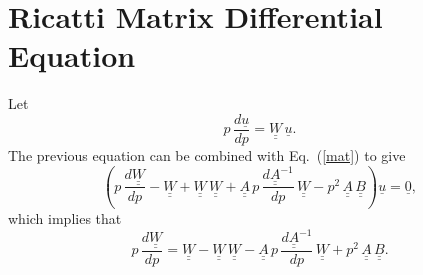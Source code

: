 \documentclass[12pt,prb,aps,notitlepage]{revtex4-1}
\begin{document}
\section{Ricatti Matrix Differential Equation}
Let
\begin{equation}\label{wdef}
 p\,\frac{d\underline{u}}{dp}=\underline{\underline{W}}\,\underline{u}.
\end{equation}
The previous equation can be combined with Eq.~(\ref{mat}) to give 
\begin{equation}
\left(p\,\frac{d\underline{\underline{W}}}{dp} - \underline{\underline{W}} 
+ \underline{\underline{W}}\,\underline{\underline{W}} + \underline{\underline{A}}\,p\,\frac{d\underline{\underline{A}}^{-1}}{dp}\,\underline{\underline{W}}- p^2\,\underline{\underline{A}}\,\underline{\underline{B}}\right)\underline{u} = \underline{0},
\end{equation}
which implies that 
\begin{equation}\label{eq96}
p\,\frac{d\underline{\underline{W}}}{dp} = \underline{\underline{W}} - \underline{\underline{W}}\,\underline{\underline{W}} - \underline{\underline{A}}\,p\,\frac{d\underline{\underline{A}}^{-1}}{dp}\,\underline{\underline{W}}
+ p^2\,\underline{\underline{A}}\,\underline{\underline{B}}.
\end{equation}
\end{document}
